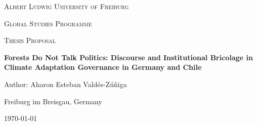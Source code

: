 \begin{titlepage}
  \thispagestyle{empty}
  \centering

  {\LARGE \textsc{Albert Ludwig University of Freiburg}\par}
  \vspace{0.5em}
  {\Large \textsc{Global Studies Programme}\par}
  \vspace{0.25em}
  {\large \textsc{Thesis Proposal}\par}

  \vspace{3cm}
  {\huge\bfseries Forests Do Not Talk Politics: Discourse and Institutional Bricolage in Climate Adaptation Governance in Germany and Chile \par}

  \vspace{2cm}
  {\Large Author: Aharon Esteban Valdés-Zúñiga\par}

  \vfill
  {\large Freiburg im Breisgau, Germany\par}
  {\large \today\par}
\end{titlepage}

